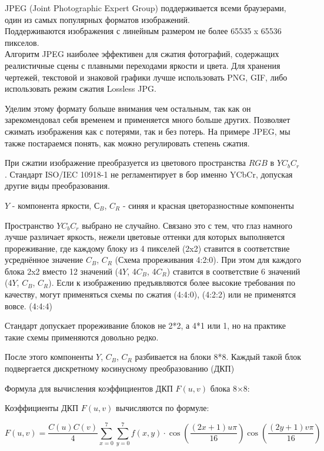 \documentclass[12pt]{article}
\begin{document}
JPEG (Joint Photographic Expert Group) поддерживается всеми браузерами,
один из самых популярных форматов изображений. \\
Поддерживаются изображения с линейным размером не более 65535 x 65536 пикселов. \\

Алгоритм JPEG наиболее эффективен для сжатия фотографий, содержащих реалистичные сцены
с плавными переходами яркости и цвета. Для хранения чертежей, текстовой и знаковой
графики лучше использовать PNG, GIF,
либо использовать режим сжатия Lossless JPG.

Уделим этому формату больше внимания чем остальным, так как он зарекомендовал себя временем
и применяется много больше других. Позволяет сжимать изображения как с потерями,
так и без потерь.
На примере JPEG, мы также постараемся понять, как можно регулировать степень сжатия.

При сжатии изображение преобразуется из цветового пространства $RGB$ в $YC_{b}C_{r}$.
Стандарт ISO/IEC 10918-1 не регламентирует в    бор именно YCbCr,
допуская другие виды преобразования.

$Y$ - компонента яркости, $С_{B}$, $C_{R}$ - синяя и красная цветоразностные компоненты

Пространство $YC_{b}C_{r}$  выбрано не случайно. Связано это с тем, что глаз намного лучше различает
яркость, нежели цветовые оттенки для которых выполняется прореживание, где каждому блоку
из 4 пикселей (2x2) ставится в соответствие усреднённое значение $C_{B}$, $C_{R}$ (Схема прореживания 4:2:0).
При этом для каждого блока 2x2 вместо 12 значений (4$Y$, 4$C_{B}$, 4$C_{R}$)
ставится в соответствие 6 значений (4$Y$, $C_{B}$, $C_{R}$). Если к изображению предъявляются более высокие
требования по качеству, могут применяться схемы по сжатия (4:4:0), (4:2:2)
или не применятся вовсе. (4:4:4)

Стандарт допускает прореживание блоков не 2*2, а 4*1 или 1,
но на практике такие схемы применяются довольно редко.

После этого компоненты $Y$, $C_{B}$, $C_{R}$ разбивается на блоки 8*8.
Каждый такой блок подвергается дискретному косинусному преобразованию (ДКП)

Формула для вычисления коэффициентов ДКП $F(u,v)$ блока 8×8:

Коэффициенты ДКП $F(u,v)$ вычисляются по формуле:

\[
    F(u,v) = \frac{C(u)C(v)}{4} \sum_{x=0}^{7} \sum_{y=0}^{7} f(x,y) \cdot \cos\left(\frac{(2x+1)u\pi}{16}\right) \cos\left(\frac{(2y+1)v\pi}{16}\right)
\]
\end{document}
